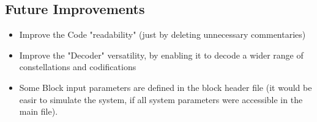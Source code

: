 \subsection*{Future Improvements}
\begin{itemize}
    \item Improve the Code "readability" (just by deleting unnecessary commentaries)
    \item Improve the "Decoder" versatility, by enabling it to decode a wider range of constellations and codifications
    \item Some Block input parameters are defined in the block header file (it would be easir to simulate the system, if all system parameters were accessible in the main file).
\end{itemize} 